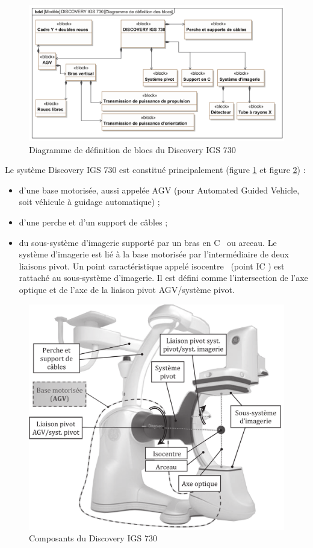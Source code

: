 \begin{figure}[ht!]
\begin{center}
 \includegraphics[width=0.7\linewidth]{img/fig04}
\end{center}
\caption{Diagramme de définition de blocs du Discovery IGS 730}
\label{fig04}
\end{figure}

Le système Discovery IGS 730 est constitué principalement (figure \ref{fig04} et figure \ref{fig05}) :
\begin{itemize}
 \item d'une base motorisée, aussi appelée AGV (pour Automated Guided Vehicle, soit véhicule à guidage automatique) ;
 \item d'une perche et d'un support de câbles ;
 \item du sous-système d'imagerie supporté par un bras en \og C \fg\ ou arceau. Le système d'imagerie est lié à la base motorisée par l'intermédiaire de deux liaisons pivot. Un point caractéristique appelé \og isocentre \fg\ (point IC ) est rattaché au sous-système d'imagerie. Il est défini comme
l'intersection de l'axe optique et de l'axe de la liaison pivot AGV/système pivot.
\end{itemize}

\begin{figure}[ht!]
\begin{center}
 \includegraphics[width=0.6\linewidth]{img/fig05}
\end{center}
\caption{Composants du Discovery IGS 730}
\label{fig05}
\end{figure}

